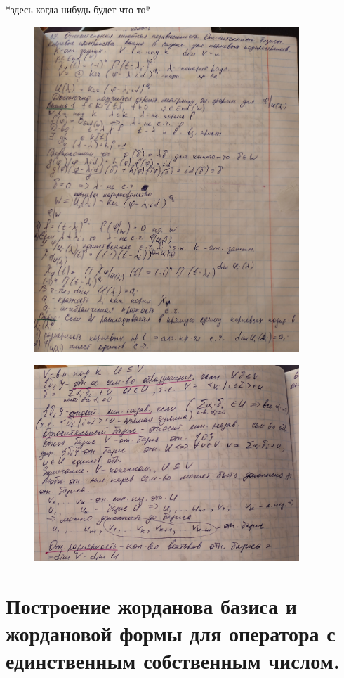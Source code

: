 \documentclass[algebra]{subfiles}
\begin{document}
    *здесь когда-нибудь будет что-то*
    \begin{figure}[H]
            \includegraphics[width=10cm]{pics/l59_1}
            \centering
    \end{figure}
    \begin{figure}[H]
            \includegraphics[width=10cm]{pics/l59_2}
            \centering
    \end{figure}

    \section{Построение жорданова базиса и жордановой формы для оператора с единственным собственным числом.}
\end{document}
